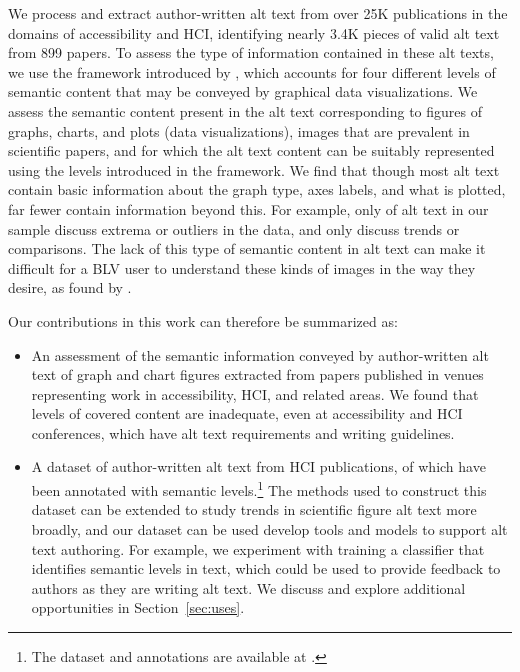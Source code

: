 \documentclass[sigconf]{acmart}
\begin{document}
We process and extract author-written alt text from over 25K publications in the domains of accessibility and HCI, identifying nearly 3.4K pieces of valid alt text from 899 papers. To assess the type of information contained in these alt texts, we use the framework introduced by \citet{Lundgard2022AccessibleVV}, which accounts for four different levels of semantic content that may be conveyed by graphical data visualizations. We assess the semantic content present in the alt text corresponding to figures of graphs, charts, and plots (data visualizations), images that are prevalent in scientific papers, and for which the alt text content can be suitably represented using the levels introduced in the \citet{Lundgard2022AccessibleVV} framework.
We find that though most alt text contain basic information about the graph type, axes labels, and what is plotted, far fewer contain information beyond this.
For example, only \percleveltwo of alt text in our sample discuss extrema or outliers in the data, and only \perclevelthree discuss trends or comparisons. The lack of this type of semantic content in alt text can make it difficult for a BLV user to understand these kinds of images in the way they desire, as found by \citet{Lundgard2022AccessibleVV}.


Our contributions in this work can therefore be summarized as:
\begin{itemize}
    \item An assessment of the semantic information conveyed by author-written alt text of graph and chart figures extracted from papers published in venues representing work in accessibility, HCI, and related areas. We found that levels of covered content are inadequate, even at accessibility and HCI conferences, which have alt text requirements and writing guidelines.
    \item A dataset of \numvalidalttext author-written alt text from HCI publications, of which \totalalttext have been annotated with semantic levels.\footnote{The dataset and annotations are available at \githublink.} The methods used to construct this dataset can be extended to study trends in scientific figure alt text more broadly,
    and our dataset can be used develop tools and models to support alt text authoring. For example, we experiment with training a classifier that identifies semantic levels in text, which could be used to provide feedback to authors as they are writing alt text. We discuss and explore additional opportunities in Section~\ref{sec:uses}.
\end{itemize}
\end{document}
